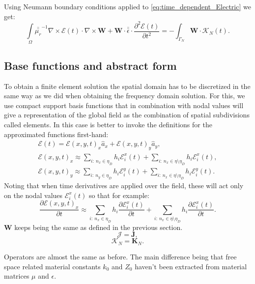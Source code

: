 Using Neumann boundary conditions applied to \ref{eq:time_dependent_Electric} we get:
\begin{equation}
\int\limits_{\Omega} \bar{\bar{\mu_r}}^{-1}\nabla\times \mathcal{E}(t)\cdot \nabla\times\mathbf{W}
+ \mathbf{W}\cdot\bar{\bar{\epsilon}}\cdot\frac{\partial ^2\mathcal{E}(t)}{\partial t^2}=-\int_{\Gamma_N}\mathbf{W}\cdot\mathcal{K}_N(t). \label{eq:td_weak_form_E_equation}
\end{equation}

\subsection{Base functions and abstract form}
To obtain a finite element solution the spatial domain has to be discretized in the same way as we did when obtaining the frequency domain solution. For this, we use compact support basis functions that in combination with nodal values will give a representation of the global field as the combination of spatial  subdivisions called elements.
In this case is better to invoke the definitions for the approximated functions first-hand:
\begin{align*}
\mathcal{E}(t)=\mathcal{E}(x,y,t)_x\hat{a}_x + \mathcal{E}(x,y,t)_y \hat{a}_y,\\
\mathcal{E}(x,y,t)_x\approx \sum_{i:\ n_x \in \eta_D} h_i \mathcal{E}_i^x(t)+\sum_{i:\ n_x \in \eta\setminus\eta_D} h_i \mathcal{E}_i^x(t),\\
\mathcal{E}(x,y,t)_y\approx \sum_{i:\ n_y \in \eta_D}h_i\mathcal{E}_i^y(t)+
\sum_{i:\ n_x \in \eta\setminus\eta_D}h_i\mathcal{E}_i^y(t).
\end{align*}
Noting that when time derivatives are applied over the field, these will act only on the nodal values $\mathcal{E}_i^x(t)$ so that for example:
\[\frac{\partial \mathcal{E}(x,y,t)_x}{\partial t}\approx \sum_{i:\ n_x \in \eta_D} h_i \frac{\partial \mathcal{E}_i^x(t)}{\partial t}+\sum_{i:\ n_x \in \eta\setminus\eta_D} h_i \frac{\partial\mathcal{E}_i^x(t)}{\partial t}.\]
$\mathbf{W}$ keeps being the same as defined in the previous section.\[\mathcal{J}=\mathbf{J},\]
\[\mathcal{K}_N=\mathbf{K}_N.\]

Operators are almost the same as before. The main difference being that free space related material constants $k_0$ and $Z_0$ haven't been extracted from material matrices $\mu$ and $\epsilon$.

